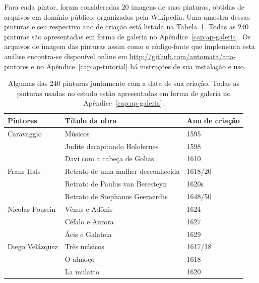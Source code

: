 Para cada pintor, foram consideradas 20 imagens de suas pinturas,
obtidas de arquivos em domínio público, organizados pela
Wikipedia. Uma amostra dessas pinturas e seu respectivo ano de criação
está listada na Tabela~\ref{tab:paintings}. Todas as 240 pinturas são
apresentadas em forma de galeria no Apêndice~\ref{cap:ap-galeria}. Os
arquivos de imagem das pinturas assim como o código-fonte que
implementa esta análise encontra-se disponível online em
\url{http://github.com/automata/ana-pintores} e no
Apêndice~\ref{cap:ap-tutorial} há instruções de sua instalação e uso.

\begin{table} 
  \begin{center}
  \caption{\label{tab:paintings} Algumas das 240 pinturas juntamente
    com a data de sua criação. Todas as pinturas usadas no estudo
    estão apresentadas em forma de galeria no
    Apêndice~\ref{cap:ap-galeria}.}

\begin{tabular}{l|l|l}
\hline

 Pintores & Título da obra                       & Ano de criação \\ 
 
 \hline

 Caravaggio          & Músicos & 1595 \\
                     & Judite decapitando Holofernes & 1598 \\
                     & Davi com a cabeça de Golias & 1610 \\
                      
 Frans Hals          & Retrato de uma mulher desconhecida & 1618/20 \\
                     & Retrato de Paulus van Beresteyn & 1620s \\
                     & Retrato de Stephanus Geeraerdts & 1648/50 \\

 Nicolas Poussin     & Vênus e Adônis & 1624 \\
                     & Céfalo e Aurora & 1627 \\
                     & Ácis e Galateia & 1629 \\
 
 Diego Velázquez     & Três músicos & 1617/18 \\
                     & O almoço & 1618 \\
                     & La mulatto & 1620 \\
 

\end{tabular}
\end{center}
\end{table}
